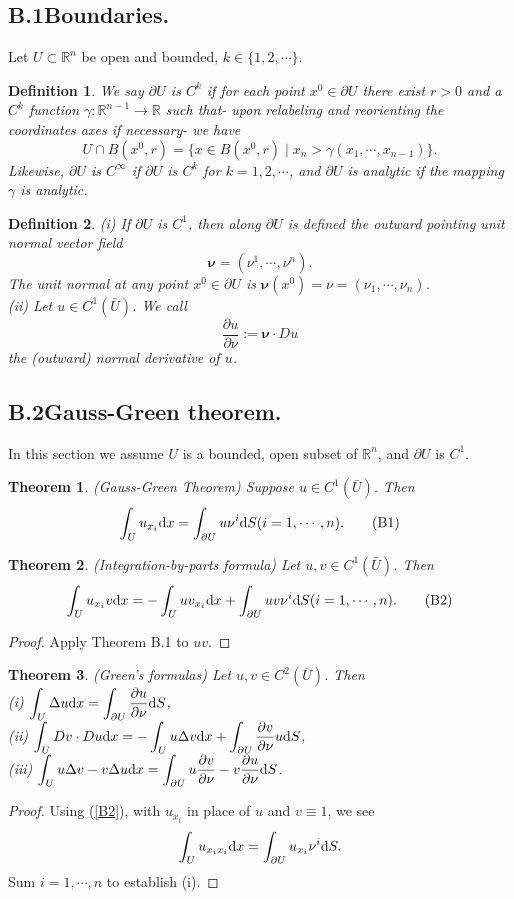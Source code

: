 \documentclass[hyperref,UTF8,12pt]{article}
\numberwithin{equation}{subsection}
\theoremstyle{plain}
\newtheorem{theorem}{Theorem}
\newtheorem{definition}{Definition}
\theoremstyle{definition}
\numberwithin{theorem}{section}
\numberwithin{lemma}{section}
\numberwithin{proposition}{section}
\numberwithin{remark}{section}
\numberwithin{corollary}{section}
\numberwithin{definition}{section}
\numberwithin{problem}{section}
\numberwithin{example}{section}
\def\dif{\textup{d}}
\newcommand{\dis}{\displaystyle}
\newcommand{\ptl}{\partial}
\newcommand{\mr}{\mathbb{R}}
\begin{document}
\begin{appendices}
\subsection*{B.1\quad Boundaries.}
Let $U\subset\mr^n$ be open and bounded, $k\in\{1,2,\cdots\}$.
\begin{definition}
We say $\ptl U$ is $C^k$ if for each point $x^0\in\ptl U$ there exist $r>0$ and a $C^k$ function $\gamma:\mr^{n-1}\to\mr$ such that- upon relabeling and reorienting the coordinates axes if necessary- we have
\[U\cap B(x^0,r)=\{x\in B(x^0,r)\mid x_n>\gamma(x_1,\cdots,x_{n-1})\}.\]
Likewise, $\ptl U$ is $C^\infty$ if $\ptl U$ is $C^k$ for $k=1,2,\cdots$, and $\ptl U$ is analytic if the mapping $\gamma$ is analytic.
\end{definition}
\begin{definition}\label{ounv}
\textup{(i)} If $\ptl U$ is $C^1$, then along $\ptl U$ is defined the outward pointing unit normal vector field\[\bm{\nu}=(\nu^1,\cdots,\nu^n).\]
The unit normal at any point $x^0\in\ptl U$ is $\bm{\nu}(x^0)=\nu=(\nu_1,\cdots,\nu_n)$.\\
\textup{(ii)} Let $u\in C^1(\bar{U})$. We call\[\frac{\ptl u}{\ptl\nu}:=\bm{\nu}\cdot Du\]the (outward) normal derivative of $u$.
\end{definition}
\subsection*{B.2\quad Gauss-Green theorem.}
In this section we assume $U$ is a bounded, open subset of $\mr^n$, and $\ptl U$ is $C^1$.
\begin{theorem}\label{GGt}
(Gauss-Green Theorem) Suppose $u\in C^1(\bar{U})$. Then
\[\int_Uu_{x_i}\dif x=\int_{\ptl U}u\nu^i\dif S(i=1,\cdots,n).\tag{B1}\]
\end{theorem}
\begin{theorem}
(Integration-by-parts formula) Let $u,v\in C^1(\bar{U})$. Then
\[\int_Uu_{x_i}v\dif x=-\int_Uuv_{x_i}\dif x+\int_{\ptl U}uv\nu^i\dif S(i=1,\cdots,n).\label{B2}\tag{B2}\]
\end{theorem}
\begin{proof}
Apply Theorem B.1 to $uv$.
\end{proof}
\begin{theorem}
	\label{thmb3}
(Green's formulas) Let $u,v\in C^2(\bar{U})$. Then\\
\textup{(i)} $\dis\int_U\Delta u\dif x=\int_{\ptl U} \frac{\ptl u}{\ptl\nu}\dif S$,\\
\textup{(ii)} $\dis\int_UDv\cdot Du\dif x=-\int_Uu\Delta v\dif x+\int_{\ptl U}\frac{\ptl v}{\ptl \nu}u\dif S$,\\[6pt]
\textup{(iii)} $\dis\int_Uu\Delta v-v\Delta u\dif x=\int_{\ptl U}u\frac{\ptl v}{\ptl\nu}-v\frac{\ptl u}{\ptl\nu}\dif S$.
\end{theorem}
\begin{proof}
Using (\ref{B2}), with $u_{x_i}$ in place of $u$ and $v\equiv1$, we see
\[\int_Uu_{x_ix_i}\dif x=\int_{\ptl U}u_{x_i}\nu^i\dif S.\]Sum $i=1,\cdots,n$ to establish (i).


\end{proof}
\end{appendices}
\end{document}

